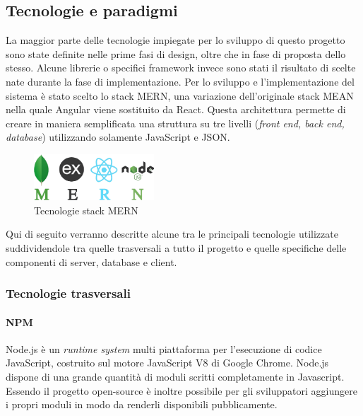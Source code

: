 \subsection{Tecnologie e paradigmi}

La maggior parte delle tecnologie impiegate per lo sviluppo di questo progetto sono state definite nelle prime fasi di design, oltre che in fase di proposta dello stesso. Alcune librerie o specifici framework invece sono stati il risultato di scelte nate durante la fase di implementazione.
Per lo sviluppo e l'implementazione del sistema è stato scelto lo stack MERN, una variazione dell'originale stack MEAN \cite{meanWikipedia} nella quale Angular viene sostituito da React. Questa architettura permette di creare in maniera semplificata una struttura su tre livelli (\emph{front end, back end, database}) utilizzando solamente JavaScript e JSON.

\begin{figure}[H]
\centering
\includegraphics[width=0.4\textwidth]{img/logos/MERN-logo.png}
\caption{Tecnologie stack MERN}
\label{fig:mern}
\end{figure}

Qui di seguito verranno descritte alcune tra le principali tecnologie utilizzate suddividendole tra quelle trasversali a tutto il progetto e quelle specifiche delle componenti di server, database e client.

\subsubsection{Tecnologie trasversali}

\paragraph{NPM}
Node.js \cite{nodejsWikipedia} è un \emph{runtime system} multi piattaforma per l'esecuzione di codice JavaScript, costruito sul motore JavaScript V8 di Google Chrome.
Node.js dispone di una grande quantità di moduli scritti completamente in Javascript.
Essendo il progetto open-source è inoltre possibile per gli sviluppatori aggiungere i propri moduli in modo da renderli disponibili pubblicamente.

